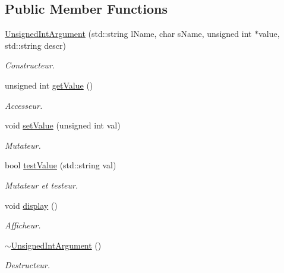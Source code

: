 \subsection*{Public Member Functions}
\begin{DoxyCompactItemize}
\item 
\hyperlink{classUnsignedIntArgument_a6254cd2a6fd9df7294a5c267ea11ffb0}{Unsigned\-Int\-Argument} (std\-::string l\-Name, char s\-Name, unsigned int $\ast$value, std\-::string descr)
\begin{DoxyCompactList}\small\item\em Constructeur. \end{DoxyCompactList}\item 
unsigned int \hyperlink{classUnsignedIntArgument_ab4dff7bc225b9313437ed45a1debddf6}{get\-Value} ()
\begin{DoxyCompactList}\small\item\em Accesseur. \end{DoxyCompactList}\item 
void \hyperlink{classUnsignedIntArgument_aa5c187eb0c69d2ab0148ab7b780ecf70}{set\-Value} (unsigned int val)
\begin{DoxyCompactList}\small\item\em Mutateur. \end{DoxyCompactList}\item 
bool \hyperlink{classUnsignedIntArgument_a46d930be372e3443fc3f3a2419ceb387}{test\-Value} (std\-::string val)
\begin{DoxyCompactList}\small\item\em Mutateur et testeur. \end{DoxyCompactList}\item 
void \hyperlink{classUnsignedIntArgument_a4abf29719479c55ee030821e02699834}{display} ()
\begin{DoxyCompactList}\small\item\em Afficheur. \end{DoxyCompactList}\item 
\hyperlink{classUnsignedIntArgument_a7cceb33cfeae1fe3274c3e08d6636fe1}{$\sim$\-Unsigned\-Int\-Argument} ()
\begin{DoxyCompactList}\small\item\em Destructeur. \end{DoxyCompactList}\end{DoxyCompactItemize}


